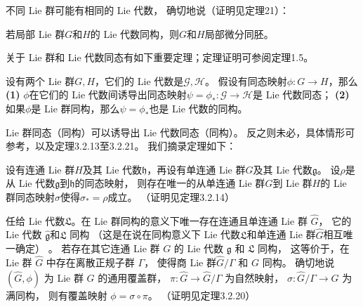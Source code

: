 不同 Lie 群可能有相同的 Lie 代数，
确切地说（证明见\parencite[\S 3.7]{huangxg-2024}定理21）：
\begin{theorem}\label{chlg:thm_g2G}
    若局部 Lie 群$G$和$H$的 Lie 代数同构，则$G$和$H$局部微分同胚。
\end{theorem}


关于 Lie 群和 Lie 代数同态有如下重要定理；定理证明可参阅\parencite[\S 6.1]{cc2001-zh}定理1.5。 %
\begin{theorem}\label{chlg:thm_tglie}
    设有两个 Lie 群$G,H$，它们的 Lie 代数是$\mathscr{G},\mathscr{H}$。
    假设有同态映射$\phi:G\to H$，那么
    {\bfseries (1)} $\phi$在它们的 Lie 代数间诱导出同态映射$\psi=\phi_{*}:\mathscr{G}\to \mathscr{H}$是 Lie 代数同态；    
    {\bfseries (2)} 如果$\phi$是 Lie 群同构，那么$\psi=\phi_{*}$也是 Lie 代数的同构。    
\end{theorem}

 Lie 群同态（同构）可以诱导出 Lie 代数同态（同构）。 %
反之则未必，具体情形可参考\parencite[p.226--231]{xuyc-2001}，以及定理3.2.13至3.2.21。
我们摘录定理如下： %
\begin{theorem}\label{chlg:thm_LA2LG}
    设有连通 Lie 群$H$及其 Lie 代数$\mathfrak{h}$，再设有单连通 Lie 群$G$及其 Lie 代数$\mathfrak{g}$。
    设$\rho$是从 Lie 代数$\mathfrak{g}$到$\mathfrak{h}$的同态映射，
    则存在唯一的从单连通 Lie 群$G$到 Lie 群$H$的 Lie 群同态映射$\sigma$使得$\sigma_{*}=\rho$成立。 
    （证明见\parencite[p.235]{xuyc-2001}定理3.2.14）
\end{theorem}

\begin{theorem}\label{chlg:thm_LA2LG-all}
    任给 Lie 代数$\mathfrak{L}$。在 Lie 群同构的意义下唯一存在连通且单连通 Lie 群 $\widehat{G}$，
    它的 Lie 代数 $\widehat{\mathfrak{g}}$和$\mathfrak{L}$ 同构
    （这是在说在同构意义下 Lie 代数$\mathfrak{L}$和单连通 Lie 群$\widehat{G}$相互唯一确定）   。
    若存在其它连通 Lie 群 $G$ 的 Lie 代数 $\mathfrak{g}$ 和 $\mathfrak{L}$ 同构，
    这等价于，在 Lie 群 $\widehat{G}$ 中存在离散正规子群 $\Gamma$，
    使得商 Lie 群$\widehat{G} / \Gamma$ 和 $G$ 同构。
    确切地说$(\widehat{G}, \phi)$ 为 Lie 群 $G$ 的通用覆盖群，
    $\pi: \widehat{G} \rightarrow \widehat{G} / \Gamma $ 为自然映射，
    $\sigma: \widehat{G} / \Gamma \rightarrow G$ 为满同构，
    则有覆盖映射 $\phi=\sigma \circ \pi$。 
    （证明见\parencite[p.238]{xuyc-2001}定理3.2.20）
\end{theorem}




